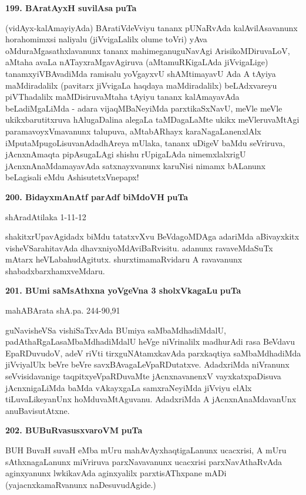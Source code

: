 \medskip
\noindent
\textbf{199. BAratAyxH suvilAsa} \hfill{\bf puTa \pageref{75}}

\smallskip
(vidAyx-kalAmayiyAda) BAratiVdeVviyu tananx pUNaRvAda kalAvilAsa\-vanunx horahomimxsi naliyalu (jiVvigaLalilx olume toVri) yAva oMdu\break raMgasathxlavanunx tananx mahimeganuguNavAgi Arisi\-koMDiruvaLoV, aMtaha avaLa nATayxraMgavAgiruva (aMtamuRKigaLAda jiVvigaLige) tanamxyiVBAva\-diMda rami\-salu yoVgayxvU shAMtimayavU Ada A tAyiya maMdiradalilx (pavitarx jiVvigaLa haqdaya maMdira\-dalilx) beLAdxvareyu piVThadalilx maMDisiruvaMtaha tAyiyu tananx kalAmayavAda beLadiMga\-LiMda - adara vijaqMBaNeyiMda parxtikaSxNavU, meVle meVle ukikxbarutitxruva hAlugaDalina alegaLa taMDagaLaMte ukikx meVleruvaMtAgi paramavoyxVmavanunx talupuva, aMtabARhayx karaNagaLanenxlAlx iMpu\-taMpu\-goLisu\-vanAdadhAreya mUlaka, tananx uDigeV baMdu seVriruva, jAcnxnAmaqta pipAsugaLAgi shishu rUpigaLAda nimemxlalxrigU jAcnxnAnaMdamayavAda satxnayxvanunx karuNisi nimamx bALanunx beLagisali eMdu AshisutetxVnepapx!

\medskip
\noindent
\textbf{200. BidayxmAnAtf parAdf biMdoVH} \hfill{\bf puTa \pageref{151}}

\hfill{shAradAtilaka 1-11-12}

\smallskip
shakitxrUpavAgidadx biMdu tatatxvXvu BeVdagoMDAga adariMda aBivayxkitx visheVSa\-rahitavAda dhavxniyoMdA\-viBaRvisitu. adanunx ravaveMdaSuTx mAtarx heVLabahu\-dAgitutx. shurxtimamaRvidaru A ravavanunx shabadxbarxhamx\-veMdaru.

\eject

\noindent
\textbf{201. BUmi saMsAthxna yoVgeVna 3 sholxVkagaLu} \hfill{\bf puTa \pageref{26}}

\hfill{mahABArata shA.pa. 244-90,91}

\smallskip
guNavisheVSa vishiSaTxvAda BUmiya saMbaMdhadiMdalU, padAthaRgaLa\break saMbaMdha\-diMdalU heVge niVrinalilx madhurAdi rasa BeVdavu EpaRDuvudoV, adeV riVti tirxguNAtamxkavAda parxkaqtiya saMbaMdhadiMda jiVviyalUlx beVre beVre savxBAva\-gaLeVpaRDutatxve. AdadxriMda niVranunx seVvisidavanige taqpitxyeVpaRDuvaMte jAcnxna\-vanenxV vayxkatxpaDisuva jAcnxnigaLiMda baMda vAkayxgaLa samxraNeyiMda jiVviyu elAlx tiLuvaLikeyanUnx hoMduvaMtAguvanu. AdadxriMda A jAcnxnAnaMdavanUnx anu\-BavisutAtxne.

\medskip
\noindent
\textbf{202. BUBuRvasusxvaroVM} \hfill{\bf puTa \pageref{116}}

\smallskip
BUH BuvaH suvaH eMba mUru mahAvAyxhaqtigaLanunx ucacxrisi, A mUru sAthxnagaLanunx miVri\-ruva parxNavavanunx ucacxrisi parxNavAthaRvAda aginxyanunx lwkikavAda aginxyalilx parxtisAThxpane mADi (yajacnx\-kamaR\-vanunx naDesuvudAgide.)



